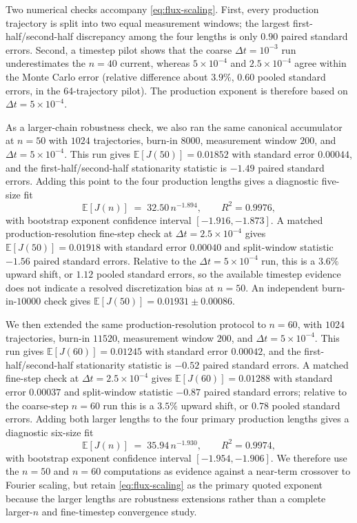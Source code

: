 \documentclass[11pt,a4paper]{article}
\theoremstyle{definition}
\newcommand{\E}{\mathbb{E}}
\numberwithin{equation}{section}   %
\begin{document}
Two numerical checks accompany \eqref{eq:flux-scaling}. First, every production
trajectory is split into two equal measurement windows; the largest
first-half/second-half discrepancy among the four lengths is only $0.90$
paired standard errors. Second, a timestep pilot shows that the coarse
$\Delta t=10^{-3}$ run underestimates the $n=40$ current, whereas
$5\times10^{-4}$ and $2.5\times10^{-4}$ agree within the Monte Carlo error
(relative difference about $3.9\%$, $0.60$ pooled standard errors, in the
64-trajectory pilot). The production exponent is therefore based on
$\Delta t=5\times10^{-4}$.

As a larger-chain robustness check, we also ran the same canonical accumulator
at $n=50$ with $1024$ trajectories, burn-in $8000$, measurement window $200$,
and $\Delta t=5\times10^{-4}$. This run gives
$\E[J(50)]=0.01852$ with standard error $0.00044$, and the
first-half/second-half stationarity statistic is $-1.49$ paired standard
errors. Adding this point to the four production lengths gives a diagnostic
five-size fit
\[
  \E[J(n)] \;=\; 32.50\,n^{-1.894},
  \qquad R^2=0.9976,
\]
with bootstrap exponent confidence interval $[-1.916,-1.873]$. A matched
production-resolution fine-step check at $\Delta t=2.5\times10^{-4}$ gives
$\E[J(50)]=0.01918$ with standard error $0.00040$ and split-window statistic
$-1.56$ paired standard errors. Relative to the $\Delta t=5\times10^{-4}$
run, this is a $3.6\%$ upward shift, or $1.12$ pooled standard errors, so the
available timestep evidence does not indicate a resolved discretization bias
at $n=50$. An independent burn-in-$10000$ check gives
$\E[J(50)]=0.01931\pm0.00086$.

We then extended the same production-resolution protocol to $n=60$, with
$1024$ trajectories, burn-in $11520$, measurement window $200$, and
$\Delta t=5\times10^{-4}$. This run gives
$\E[J(60)]=0.01245$ with standard error $0.00042$, and the
first-half/second-half stationarity statistic is $-0.52$ paired standard
errors. A matched fine-step check at $\Delta t=2.5\times10^{-4}$ gives
$\E[J(60)]=0.01288$ with standard error $0.00037$ and split-window statistic
$-0.87$ paired standard errors; relative to the coarse-step $n=60$ run this is
a $3.5\%$ upward shift, or $0.78$ pooled standard errors. Adding both larger lengths to the four primary production lengths gives
a diagnostic six-size fit
\[
  \E[J(n)] \;=\; 35.94\,n^{-1.930},
  \qquad R^2=0.9974,
\]
with bootstrap exponent confidence interval $[-1.954,-1.906]$. We therefore
use the $n=50$ and $n=60$ computations as evidence against a near-term
crossover to Fourier scaling, but retain \eqref{eq:flux-scaling} as the
primary quoted exponent because the larger lengths are robustness extensions
rather than a complete larger-$n$ and fine-timestep convergence study.
\end{document}
